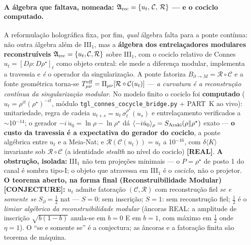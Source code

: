 \documentclass[12pt,a4paper]{article}
\newcommand{\rhostar}{\rho^{\star}}
\begin{document}
\paragraph{A álgebra que faltava, nomeada: $\mathfrak A_{\rm rec}=\{u_t,\,\mathcal C,\,\mathcal R\}$ --- e o cociclo computado.} A reformulação holográfica fixa, por fim, \emph{qual} álgebra falta para a ponte contínua: não outra álgebra além de III$_1$, mas a \textbf{álgebra dos entrelaçadores modulares reconstruíveis} $\mathfrak A_{\rm rec}=\{u_t,\mathcal C,\mathcal R\}$ sobre III$_1$, com o cociclo relativo de Connes $u_t=[D\rho:D\rhostar]_t$ como objeto central: ele mede a diferença modular, implementa a travessia e \emph{é} o operador da singularização.  A ponte fatoriza $B_{\partial\to M}=\mathcal R\circ\mathcal C$ e a fonte geométrica torna-se $T^{\rm eff}_{\mu\nu}=\Pi_{\mu\nu}[\mathcal R\circ\mathcal C(u_t)]$ --- \emph{a curvatura é a reconstrução contínua da singularização modular}.  No modelo finito o cociclo foi \textbf{computado} ($u_t=\rho^{it}(\rhostar)^{-it}$, módulo \texttt{tgl\_connes\_cocycle\_bridge.py} + PART~K ao vivo): unitariedade, regra de cadeia $u_{t+s}=u_t\,\sigma_t^{\rhostar}(u_s)$ e entrelaçamento verificados a $\sim$10$^{-14}$; o gerador $-i\,\dot u_0=\ln\rho-\ln\rhostar$ dá $\langle-i\dot u_0\rangle_\rho=S_{\rm Araki}(\rho\Vert\rhostar)$ exato --- \textbf{o custo da travessia é a expectativa do gerador do cociclo}, a ponte algébrica entre $u_t$ e a Meia-Nat; e $\mathcal R(\mathcal C(u_t))=u_t$ a 10$^{-16}$, com $\delta\langle K\rangle$ invariante sob $\mathcal R\circ\mathcal C$ (a identidade \emph{stealth} no nível do cociclo) \textbf{[REAL]}.  \textbf{A obstrução, isolada:} III$_1$ não tem projeções minimais --- o $P=\rhostar$ de posto 1 do canal é sombra tipo-I; o objeto que atravessa em III$_1$ é o \emph{cociclo}, não o projetor.  \textbf{O teorema aberto, na forma final (Reconstruibilidade Modular) [CONJECTURE]:} $u_t$ admite fatoração $(\mathcal C,\mathcal R)$ com reconstrução fiel \emph{se e somente se} $S_\partial=\tfrac12$ nat --- $S=0$: sem inscrição; $S=1$: sem reconstrução fiel; $\tfrac12$ é o \emph{limiar algébrico da reconstruibilidade modular} (âncoras REAL: a amplitude de inscrição $\sqrt{b(1-b)}$ anula-se em $b=0$ E em $b=1$, com máximo em $\tfrac12$ onde $\eta=1$).  O ``se e somente se'' é a conjectura; as âncoras e a fatoração finita são teorema de máquina.
\end{document}
